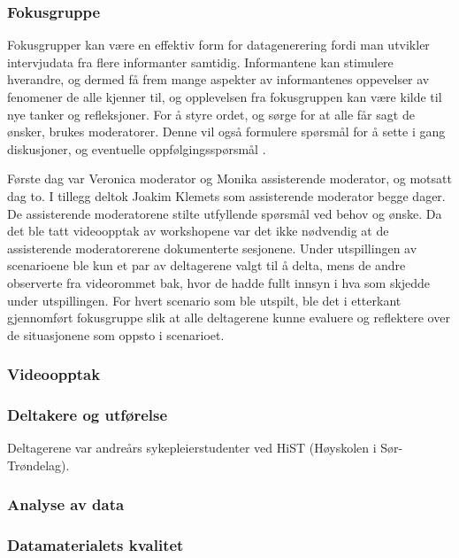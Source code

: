 \subsubsection{Fokusgruppe}
Fokusgrupper kan være en effektiv form for datagenerering fordi man utvikler intervjudata fra flere informanter samtidig. Informantene kan stimulere hverandre, og dermed få frem mange aspekter av informantenes oppevelser av fenomener de alle kjenner til, og opplevelsen fra fokusgruppen kan være kilde til nye tanker og refleksjoner. For å styre ordet, og sørge for at alle får sagt de ønsker, brukes moderatorer. Denne vil også formulere spørsmål for å sette i gang diskusjoner, og eventuelle oppfølgingsspørsmål \cite{Tjora}. 

\noindent
Første dag var Veronica moderator og Monika assisterende moderator, og motsatt dag to. I tillegg deltok Joakim Klemets som assisterende moderator begge dager. De assisterende moderatorene stilte utfyllende spørsmål ved behov og ønske. Da det ble tatt videoopptak av workshopene var det ikke nødvendig at de assisterende moderatorerene dokumenterte sesjonene. 
Under utspillingen av scenarioene ble kun et par av deltagerene valgt til å delta, mens de andre observerte fra videorommet bak, hvor de hadde fullt innsyn i hva som skjedde under utspillingen. For hvert scenario som ble utspilt, ble det i etterkant gjennomført fokusgruppe slik at alle deltagerene kunne evaluere og  reflektere over de situasjonene som oppsto i scenarioet.


\subsubsection{Videoopptak}
\subsubsection{Deltakere og utførelse}
Deltagerene var andreårs sykepleierstudenter ved HiST (Høyskolen i Sør-Trøndelag).
\subsubsection{Analyse av data}
\subsubsection{Datamaterialets kvalitet}


